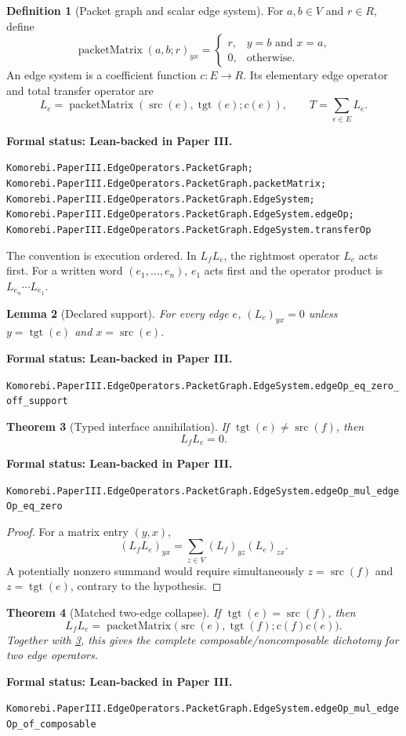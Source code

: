 \documentclass[11pt]{article}
\newtheorem{theorem}{Theorem}[section]
\newtheorem{lemma}[theorem]{Lemma}
\theoremstyle{definition}
\newtheorem{definition}[theorem]{Definition}
\theoremstyle{remark}
\newcommand{\src}{\operatorname{src}}
\newcommand{\tgt}{\operatorname{tgt}}
\newcommand{\leanname}[1]{\nolinkurl{#1}}
\newcommand{\statusleanthree}[1]{%
  \par\smallskip\noindent
  {\color{leanblue}\textbf{Formal status: Lean-backed in Paper III.}}\par
  \begingroup\small\raggedright\leanname{#1}\par\endgroup\smallskip}
\begin{document}
\begin{definition}[Packet graph and scalar edge system]
\label{def:edge-system}
For $a,b\in V$ and $r\in R$, define
\[
  \operatorname{packetMatrix}(a,b;r)_{yx}
  =
  \begin{cases}
  r,&y=b\text{ and }x=a,\\
  0,&\text{otherwise}.
  \end{cases}
\]
An edge system is a coefficient function $c:E\to R$.  Its elementary edge
operator and total transfer operator are
\[
  L_e=\operatorname{packetMatrix}(\src(e),\tgt(e);c(e)),
  \qquad
  T=\sum_{e\in E}L_e.
\]
\end{definition}
\statusleanthree{Komorebi.PaperIII.EdgeOperators.PacketGraph; Komorebi.PaperIII.EdgeOperators.PacketGraph.packetMatrix; Komorebi.PaperIII.EdgeOperators.PacketGraph.EdgeSystem; Komorebi.PaperIII.EdgeOperators.PacketGraph.EdgeSystem.edgeOp; Komorebi.PaperIII.EdgeOperators.PacketGraph.EdgeSystem.transferOp}

The convention is execution ordered.  In $L_fL_e$, the rightmost operator
$L_e$ acts first.  For a written word $(e_1,\ldots,e_n)$, $e_1$ acts first
and the operator product is $L_{e_n}\cdots L_{e_1}$.

\begin{lemma}[Declared support]
\label{lem:edge-support}
For every edge $e$, $(L_e)_{yx}=0$ unless
$y=\tgt(e)$ and $x=\src(e)$.
\end{lemma}
\statusleanthree{Komorebi.PaperIII.EdgeOperators.PacketGraph.EdgeSystem.edgeOp_eq_zero_off_support}

\begin{theorem}[Typed interface annihilation]
\label{thm:edge-annihilation}
If $\tgt(e)\ne\src(f)$, then
\[
  L_fL_e=0.
\]
\end{theorem}
\statusleanthree{Komorebi.PaperIII.EdgeOperators.PacketGraph.EdgeSystem.edgeOp_mul_edgeOp_eq_zero}

\begin{proof}
For a matrix entry $(y,x)$,
\[
  (L_fL_e)_{yx}=\sum_{z\in V}(L_f)_{yz}(L_e)_{zx}.
\]
A potentially nonzero summand would require simultaneously
$z=\src(f)$ and $z=\tgt(e)$, contrary to the hypothesis.
\end{proof}

\begin{theorem}[Matched two-edge collapse]
\label{thm:edge-composable}
If $\tgt(e)=\src(f)$, then
\[
L_fL_e
=
\operatorname{packetMatrix}
\bigl(\src(e),\tgt(f);c(f)c(e)\bigr).
\]
Together with \cref{thm:edge-annihilation}, this gives the complete
composable/noncomposable dichotomy for two edge operators.
\end{theorem}
\statusleanthree{Komorebi.PaperIII.EdgeOperators.PacketGraph.EdgeSystem.edgeOp_mul_edgeOp_of_composable}
\end{document}
